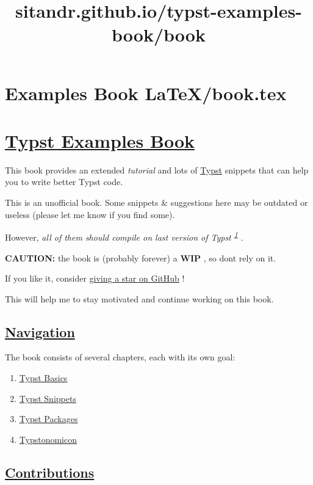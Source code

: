 \section{Examples Book LaTeX/book.tex}
\title{sitandr.github.io/typst-examples-book/book}

\section{\texorpdfstring{\hyperref[typst-examples-book]{Typst Examples
Book}}{Typst Examples Book}}\label{typst-examples-book}

This book provides an extended \emph{tutorial} and lots of
\href{https://github.com/typst/typst}{Typst} snippets that can help you
to write better Typst code.

This is an unofficial book. Some snippets \& suggestions here may be
outdated or useless (please let me know if you find some).

However, \emph{all of them should compile on last version of Typst
\textsuperscript{\hyperref[1]{1}}} .

\textbf{CAUTION:} the book is (probably forever) a \textbf{WIP} , so
don\textquotesingle t rely on it.

If you like it, consider
\href{https://github.com/sitandr/typst-examples-book}{giving a star on
GitHub} !

This will help me to stay motivated and continue working on this book.

\subsection{\texorpdfstring{\hyperref[navigation]{Navigation}}{Navigation}}\label{navigation}

The book consists of several chapters, each with its own goal:

\begin{enumerate}
\tightlist
\item
  \href{./basics/index.html}{Typst Basics}
\item
  \href{./snippets/index.html}{Typst Snippets}
\item
  \href{./packages/index.html}{Typst Packages}
\item
  \href{./typstonomicon/index.html}{Typstonomicon}
\end{enumerate}

\subsection{\texorpdfstring{\hyperref[contributions]{Contributions}}{Contributions}}\label{contributions}


